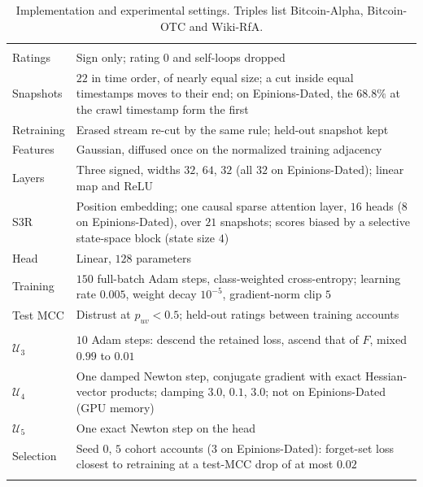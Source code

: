 \documentclass[lettersize,journal]{IEEEtran}
\begin{document}
\begin{table}[!t]
\caption{Implementation and experimental settings. Triples list Bitcoin-Alpha, Bitcoin-OTC and Wiki-RfA.}
\label{tab:settings}
\centering
\footnotesize
\setlength{\tabcolsep}{4pt}
\begin{tabular}[t]{@{}>{\raggedright\arraybackslash}p{}>{\raggedright\arraybackslash}p{}@{}}
\toprule
\multicolumn{2}{@{}l}{\textbf{Data and backbone}} \\[1pt]
Ratings & Sign only; rating $0$ and self-loops dropped \\
Snapshots & $22$ in time order, of nearly equal size; a cut inside equal timestamps moves to their end; on Epinions-Dated, the $68.8\%$ at the crawl timestamp form the first \\
Retraining & Erased stream re-cut by the same rule; held-out snapshot kept \\
Features & Gaussian, diffused once on the normalized training adjacency \\
Layers & Three signed, widths $32$, $64$, $32$ (all $32$ on Epinions-Dated); linear map and ReLU \\
S3R & Position embedding; one causal sparse attention layer, $16$ heads ($8$ on Epinions-Dated), over $21$ snapshots; scores biased by a selective state-space block (state size $4$) \\
Head & Linear, $128$ parameters \\
Training & $150$ full-batch Adam steps, class-weighted cross-entropy; learning rate $0.005$, weight decay $10^{-5}$, gradient-norm clip $5$ \\
Test MCC & Distrust at $p_{uv} < 0.5$; held-out ratings between training accounts \\
\midrule
\multicolumn{2}{@{}l}{\textbf{Unlearning operators}} \\[1pt]
$\mathcal{U}_3$ & $10$ Adam steps: descend the retained loss, ascend that of $F$, mixed $0.99$ to $0.01$ \\
$\mathcal{U}_4$ & One damped Newton step, conjugate gradient with exact Hessian-vector products; damping $3.0$, $0.1$, $3.0$; not on Epinions-Dated (GPU memory) \\
$\mathcal{U}_5$ & One exact Newton step on the head \\
Selection & Seed $0$, $5$ cohort accounts ($3$ on Epinions-Dated): forget-set loss closest to retraining at a test-MCC drop of at most $0.02$ \\
\midrule
\multicolumn{2}{@{}l}{\textbf{Laundering study}} \\[1pt]

\end{tabular}
\end{table}
\end{document}
